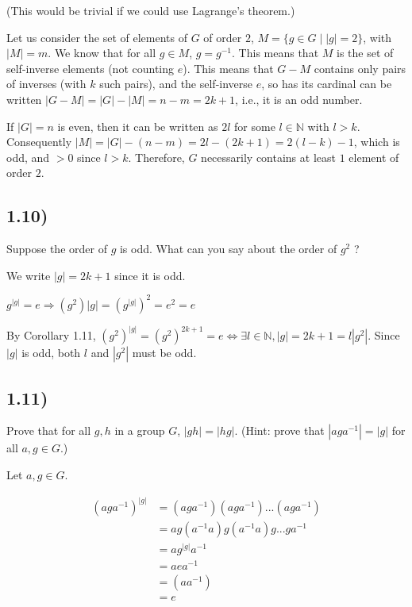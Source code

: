 \documentclass[12pt, letterpaper, twoside]{report}
\begin{document}
(This would be trivial if we could use Lagrange's theorem.)

Let us consider the set of elements of $G$ of order $2$, $M = \{ g \in G \mid |g| = 2 \}$, with $|M| = m$. We know that for all $g \in M$, $g = g^{-1}$. This means that $M$ is the set of self-inverse elements (not counting $e$). This means that $G - M$ contains only pairs of inverses (with $k$ such pairs), and the self-inverse $e$, so has its cardinal can be written $|G - M| = |G| - |M| = n - m = 2k + 1$, i.e., it is an odd number.

If $|G| = n$ is even, then it can be written as $2l$ for some $l \in \mathbb{N}$ with $l > k$. Consequently $|M| = |G| - (n - m) = 2l - (2k + 1) = 2(l - k) - 1$, which is odd, and $> 0$ since $l > k$. Therefore, $G$ necessarily contains at least $1$ element of order $2$.



\subsection*{1.10)}

Suppose the order of $g$ is odd. What can you say about the order of $g^2$ ?

We write $|g| = 2k + 1$ since it is odd.

$g^{|g|} = e \Rightarrow (g^2){|g|} = (g^{|g|})^2 = e^2 = e$

By Corollary 1.11, $(g^2)^{|g|} = (g^2)^{2k + 1} = e \Leftrightarrow \exists l \in \mathbb{N}, |g| = 2k + 1 = l|g^2|$. Since $|g|$ is odd, both $l$ and $|g^2|$ must be odd.



\subsection*{1.11)}

Prove that for all $g, h$ in a group $G$, $|gh| = |hg|$. (Hint: prove that $|aga^{-1}| = |g|$ for all $a, g \in G$.)

Let $a, g \in G$.

$$
\begin{array}{ll}
(aga^{-1})^{|g|} &= (aga^{-1})(aga^{-1})...(aga^{-1}) \\
                 &= ag(a^{-1}a)g(a^{-1}a)g...ga^{-1} \\
                 &= ag^{|g|}a^{-1} \\
                 &= aea^{-1} \\
                 &= (aa^{-1}) \\
                 &= e
\end{array}
$$
\end{document}
